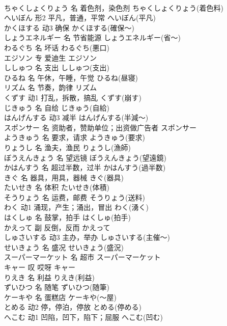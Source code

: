 \documentclass[8pt]{extreport}
\begin{document}
\begin{CJK}{UTF8}{min}
\\	ちゃくしょくりょう	名	着色剂，染色剂	ちゃくしょくりょう(着色料)	
\\	へいぼん	形2	平凡，普通，平常	へいぼん(平凡)	
\\	かくほする	动3	确保	かくほする(確保～)	
\\	しょうエネルギー	名	节省能源	しょうエネルギー(省～)	
\\	わるぐち	名	坏话	わるぐち(悪口)	
\\	エジソン	专	爱迪生	エジソン	
\\	ししゅつ	名	支出	ししゅつ(支出)	
\\	ひるね	名	午休，午睡，午觉	ひるね(昼寝)	
\\	リズム	名	节奏，韵律	リズム	
\\	くずす	动1	打乱，拆散，搞乱	くずす(崩す)	
\\	じきゅう	名	自给	じきゅう(自給)	
\\	はんげんする	动3	减半	はんげんする(半減～)	
\\	スポンサー	名	资助者，赞助单位；出资做广告者	スポンサー	
\\	ようきゅう	名	要求，请求	ようきゅう(要求)	
\\	りょうし	名	渔夫，渔民	りょうし(漁師)	
\\	ぼうえんきょう	名	望远镜	ぼうえんきょう(望遠鏡)	
\\	かはんすう	名	超过半数，过半	かはんすう(過半数)	
\\	きぐ	名	器具，用具，器械	きぐ(器具)	
\\	たいせき	名	体积	たいせき(体積)	
\\	そうりょう	名	运费，邮费	そうりょう(送料)	
\\	わく	动1	涌现，产生；涌出，冒出	わく(湧く)	
\\	はくしゅ	名	鼓掌，拍手	はくしゅ(拍手)	
\\	かえって	副	反倒，反而	かえって	
\\	しゅさいする	动3	主办，举办	しゅさいする(主催～)	
\\	せいきょう	名	盛况	せいきょう(盛況)	
\\	スーパーマーケット	名	超市	スーパーマーケット	
\\	キャー	叹	哎呀	キャー	
\\	りえき	名	利益	りえき(利益)	
\\	ずいひつ	名	随笔	ずいひつ(随筆)	
\\	ケーキや	名	蛋糕店	ケーキや(～屋)	
\\	とめる	动2	停，停泊，停放	とめる(停める)	
\\	へこむ	动1	凹陷，凹下，陷下；屈服	へこむ(凹む)	

\end{CJK}
\end{document}
